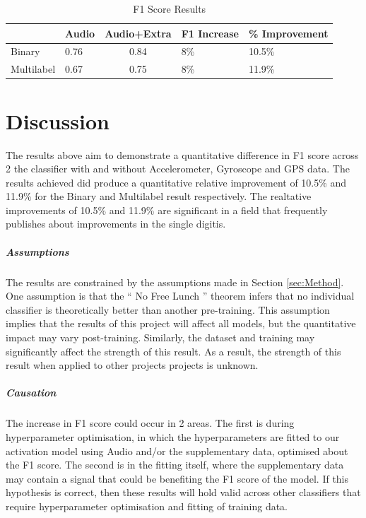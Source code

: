\documentclass{UoNMCHA}
\newcommand{\inlineQuote}[1]{`` #1 ''}
\newcommand{\sref}[1] {Section \ref{#1}}
\numberwithin{equation}{section}
\begin{document}
\begin{table}[h]
    \begin{center}  
        \caption{F1 Score Results}\label{tab:F1Results}
    \begin{tabular}{llcll}
    \hline\hline 
    & Audio & \multicolumn{1}{l}{Audio+Extra} & F1 Increase & \% Improvement \\
    \hline 
    Binary     & 0.76  & 0.84                            & 8\%    & 10.5\%        \\
    Multilabel & 0.67  & 0.75                            & 8\%    & 11.9\%        \\   
    \hline                        
    \end{tabular}
    \end{center} 
\end{table}


\clearpage \section{Discussion}\label{sec:Discussion}
The results above aim to demonstrate a quantitative difference in F1 score across 2 the classifier with and without Accelerometer, Gyroscope and GPS data. The results achieved did produce a quantitative relative improvement of 10.5\% and 11.9\% for the Binary and Multilabel result respectively. The realtative improvements of 10.5\% and 11.9\% are significant in a field that frequently publishes about improvements in the single digitis.

\subparagraph{Assumptions}
The results are constrained by the assumptions made in \sref{sec:Method}. One assumption is that the \inlineQuote{No Free Lunch} theorem infers that no individual classifier is theoretically better than another pre-training. This assumption implies that the results of this project will affect all models, but the quantitative impact may vary post-training. Similarly, the dataset and training may significantly affect the strength of this result. As a result, the strength of this result when applied to other projects projects is unknown. 

\subparagraph{Causation}
The increase in F1 score could occur in 2 areas. The first is during hyperparameter optimisation, in which the hyperparameters are fitted to our activation model using Audio and/or the supplementary data, optimised about the F1 score. The second is in the fitting itself, where the supplementary data may contain a signal that could be benefiting the F1 score of the model. If this hypothesis is correct, then these results will hold valid across other classifiers that require hyperparameter optimisation and fitting of training data.
\end{document}
